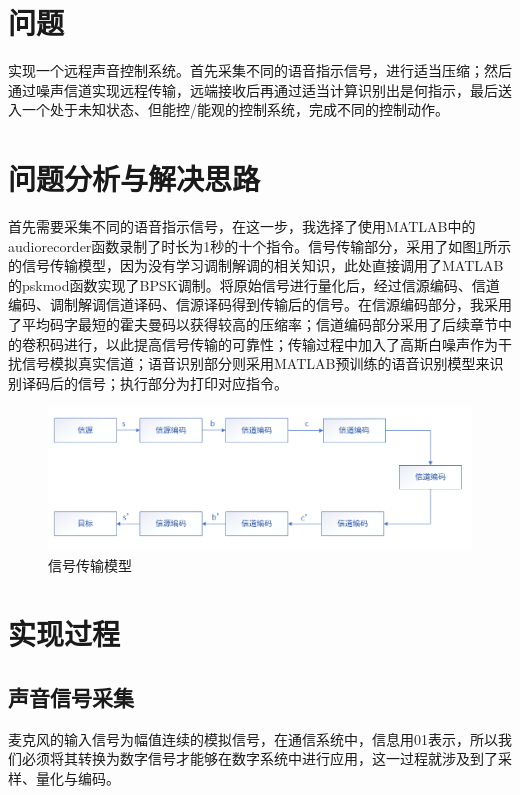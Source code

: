 \documentclass{../source/zju}
\date{\today}
\begin{document}
    \makeheader
    \section{问题}
    实现一个远程声音控制系统。首先采集不同的语音指示信号，进行适当压缩；然后通过噪声信道实现远程传输，远端接收后再通过适当计算识别出是何指示，最后送入一个处于未知状态、但能控/能观的控制系统，完成不同的控制动作。

    \section{问题分析与解决思路}
    首先需要采集不同的语音指示信号，在这一步，我选择了使用MATLAB中的audiorecorder函数录制了时长为1秒的十个指令。信号传输部分，采用了如图\ref{信号传输模型}所示的信号传输模型，因为没有学习调制解调的相关知识，此处直接调用了MATLAB的pskmod函数实现了BPSK调制。将原始信号进行量化后，经过信源编码、信道编码、调制解调信道译码、信源译码得到传输后的信号。在信源编码部分，我采用了平均码字最短的霍夫曼码以获得较高的压缩率；信道编码部分采用了后续章节中的卷积码进行，以此提高信号传输的可靠性；传输过程中加入了高斯白噪声作为干扰信号模拟真实信道；语音识别部分则采用MATLAB预训练的语音识别模型来识别译码后的信号；执行部分为打印对应指令。

    \begin{figure}[H]
        \centering
        \includegraphics[width = \textwidth]{figure/信号传输mox.png}
        \caption{信号传输模型}
        \label{信号传输模型}
    \end{figure}

    \section{实现过程}
        \subsection{声音信号采集}
           麦克风的输入信号为幅值连续的模拟信号，在通信系统中，信息用01表示，所以我们必须将其转换为数字信号才能够在数字系统中进行应用，这一过程就涉及到了采样、量化与编码。
\end{document}
